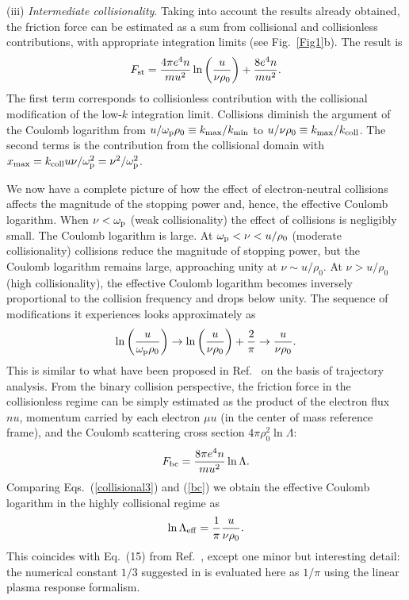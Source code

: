 \documentclass[twocolumn, 
  aps, prl,
  amsmath,amssymb,
  ]{revtex4-1}
\begin{document}
(iii) {\it Intermediate collisionality}. Taking into account the results already obtained, the friction force can be estimated as a sum from collisional and collisionless contributions, with appropriate integration limits (see Fig.~\ref{Fig1}b). The result is 
\begin{equation}\label{intermediate}
F_{\rm st} = \frac{4\pi e^4 n}{mu^2}\ln\left(\frac{u}{\nu\rho_0}\right)+\frac{8e^4n}{mu^2}.
\end{equation}
The first term corresponds to collisionless contribution with the collisional modification of the low-$k$ integration limit. Collisions diminish the argument of the Coulomb logarithm from $u/\omega_{\rm p}\rho_0\equiv k_{\rm max}/k_{\rm min}$ to $u/\nu\rho_0\equiv k_{\rm max}/k_{\rm coll}$. The second terms is the contribution from the collisional domain with $x_{\rm max}=k_{\rm coll}u\nu/\omega_{\rm p}^2=\nu^2/\omega_{\rm p}^2$. 

We now have a complete picture of how the effect of electron-neutral collisions affects the magnitude of the stopping power and, hence, the effective Coulomb logarithm. When $\nu<\omega_{\rm p}$ (weak collisionality) the effect of collisions is negligibly small. The Coulomb logarithm is large. At $\omega_{\rm p}<\nu< u/\rho_0$ (moderate collisionality) collisions reduce the magnitude of stopping power, but the Coulomb logarithm remains large, approaching unity at $\nu\sim u/\rho_0$. At $\nu > u/\rho_0$ (high collisionality), the effective Coulomb logarithm becomes inversely proportional to the collision frequency and drops below unity. The sequence of modifications it experiences looks approximately as
\begin{displaymath}
\ln\left(\frac{u}{\omega_{\rm p}\rho_0}\right)\rightarrow \ln\left(\frac{u}{\nu\rho_0}\right)+\frac{2}{\pi} \rightarrow \frac{u}{\nu\rho_0}.
\end{displaymath}
This is similar to what have been proposed in Ref.~\cite{HagelaarPRL2019} on the basis of trajectory analysis. From the binary collision perspective, the friction force in the collisionless regime can be simply estimated as the product of the electron flux $nu$, momentum carried by each electron $\mu u$ (in the center of mass reference frame), and the Coulomb scattering cross section $4\pi\rho_0^2\ln\Lambda$:
\begin{equation}\label{bc}
F_{\rm bc}= \frac{8\pi e^4 n}{mu^2}\ln\Lambda.
\end{equation}           
Comparing Eqs.~(\ref{collisional3}) and (\ref{bc}) we obtain the effective Coulomb logarithm in the highly collisional regime as
\begin{equation}
\ln\Lambda_{\rm eff}=\frac{1}{\pi}\frac{u}{\nu\rho_0}.
\end{equation}
This coincides with Eq.~(15) from Ref.~\cite{HagelaarPRL2019}, except one minor but interesting detail: the numerical constant $1/3$ suggested in \cite{HagelaarPRL2019} is evaluated here as $1/\pi$ using the linear plasma response formalism.       
\end{document}

